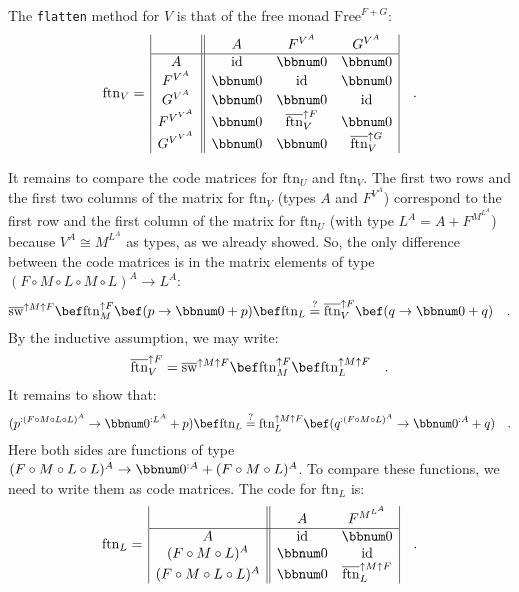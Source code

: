 The \lstinline!flatten! method for $V$ is that of the free monad
$\text{Free}^{F+G}$:
\[
\text{ftn}_{V}=\,\begin{array}{|c||ccc|}
 & A & F^{V^{A}} & G^{V^{A}}\\
\hline A & \text{id} & \bbnum 0 & \bbnum 0\\
F^{V^{A}} & \bbnum 0 & \text{id} & \bbnum 0\\
G^{V^{A}} & \bbnum 0 & \bbnum 0 & \text{id}\\
F^{V^{V^{A}}} & \bbnum 0 & \overline{\text{ftn}}_{V}^{\uparrow F} & \bbnum 0\\
G^{V^{V^{A}}} & \bbnum 0 & \bbnum 0 & \overline{\text{ftn}}_{V}^{\uparrow G}
\end{array}\quad.
\]

It remains to compare the code matrices for $\text{ftn}_{U}$ and
$\text{ftn}_{V}$. The first two rows and the first two columns of
the matrix for $\text{ftn}_{V}$ (types $A$ and $F^{V^{A}}$) correspond
to the first row and the first column of the matrix for $\text{ftn}_{U}$
(with type $L^{A}=A+F^{M^{L^{A}}}$) because $V^{A}\cong M^{L^{A}}$
as types, as we already showed. So, the only difference between the
code matrices is in the matrix elements of type $(F\circ M\circ L\circ M\circ L)^{A}\rightarrow L^{A}$:
\[
\overline{\text{sw}}^{\uparrow M\uparrow F}\bef\text{ftn}_{M}^{\uparrow F}\bef(p\rightarrow\bbnum 0+p)\bef\text{ftn}_{L}\overset{?}{=}\overline{\text{ftn}}_{V}^{\uparrow F}\bef(q\rightarrow\bbnum 0+q)\quad.
\]
By the inductive assumption, we may write:
\[
\overline{\text{ftn}}_{V}^{\uparrow F}=\overline{\text{sw}}^{\uparrow M\uparrow F}\bef\text{ftn}_{M}^{\uparrow F}\bef\text{ftn}_{L}^{\uparrow M\uparrow F}\quad.
\]
It remains to show that:
\[
(p^{:(F\circ M\circ L\circ L)^{A}}\rightarrow\bbnum 0^{:L^{A}}+p)\bef\text{ftn}_{L}\overset{?}{=}\text{ftn}_{L}^{\uparrow M\uparrow F}\bef(q^{:(F\circ M\circ L)^{A}}\rightarrow\bbnum 0^{:A}+q)\quad.
\]
Here both sides are functions of type $(F\circ M\circ L\circ L)^{A}\rightarrow\bbnum 0^{:A}+(F\circ M\circ L)^{A}$.
To compare these functions, we need to write them as code matrices.
The code for $\text{ftn}_{L}$ is:
\[
\text{ftn}_{L}=\,\begin{array}{|c||cc|}
 & A & F^{M^{L^{A}}}\\
\hline A & \text{id} & \bbnum 0\\
(F\circ M\circ L)^{A} & \bbnum 0 & \text{id}\\
(F\circ M\circ L\circ L)^{A} & \bbnum 0 & \overline{\text{ftn}}_{L}^{\uparrow M\uparrow F}
\end{array}\quad.
\]
